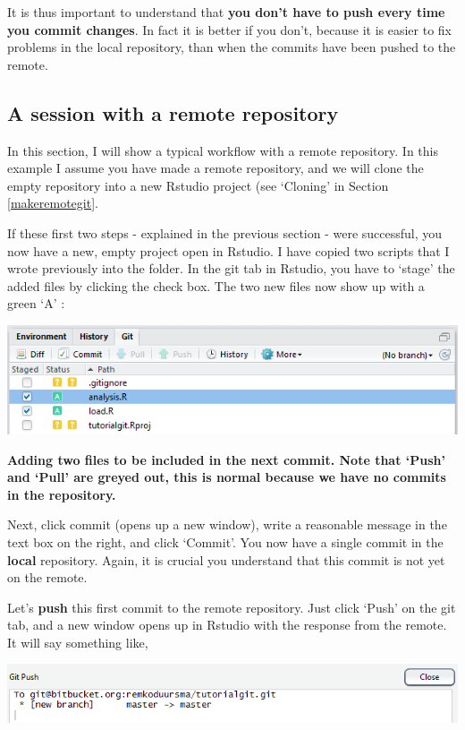 \documentclass[]{book}
\begin{document}
It is thus important to understand that \textbf{you don't have to push every time you commit changes}. In fact it is better if you don't, because it is easier to fix problems in the local repository, than when the commits have been pushed to the remote.

\hypertarget{a-session-with-a-remote-repository}{%
\subsection{A session with a remote repository}\label{a-session-with-a-remote-repository}}

In this section, I will show a typical workflow with a remote repository. In this example I assume you have made a remote repository, and we will clone the empty repository into a new Rstudio project (see `Cloning' in Section \ref{makeremotegit}.

If these first two steps - explained in the previous section - were successful, you now have a new, empty project open in Rstudio. I have copied two scripts that I wrote previously into the folder. In the git tab in Rstudio, you have to `stage' the added files by clicking the check box. The two new files now show up with a green `A' :

\includegraphics[width=0.75\linewidth]{screenshots/session2stage1}

\textbf{Adding two files to be included in the next commit. Note that `Push' and `Pull' are greyed out, this is normal because we have no commits in the repository.}

Next, click commit (opens up a new window), write a reasonable message in the text box on the right, and click `Commit'. You now have a single commit in the \textbf{local} repository. Again, it is crucial you understand that this commit is not yet on the remote.

Let's \textbf{push} this first commit to the remote repository. Just click `Push' on the git tab, and a new window opens up in Rstudio with the response from the remote. It will say something like,

\includegraphics[width=0.75\linewidth]{screenshots/session2firstpush}
\end{document}
